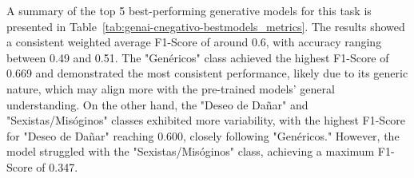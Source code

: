 \newpage

A summary of the top 5 best-performing generative models for this task is presented in Table~\ref{tab:genai-cnegativo-bestmodels_metrics}. The results showed a consistent weighted average F1-Score of around 0.6, with accuracy ranging between 0.49 and 0.51. The "Genéricos" class achieved the highest F1-Score of 0.669 and demonstrated the most consistent performance, likely due to its generic nature, which may align more with the pre-trained models' general understanding. On the other hand, the "Deseo de Dañar" and "Sexistas/Misóginos" classes exhibited more variability, with the highest F1-Score for "Deseo de Dañar" reaching 0.600, closely following "Genéricos." However, the model struggled with the "Sexistas/Misóginos" class, achieving a maximum F1-Score of 0.347.


\begin{table}[H]
    \centering
    \begingroup
    \small %
    \endgroup
\end{table}



